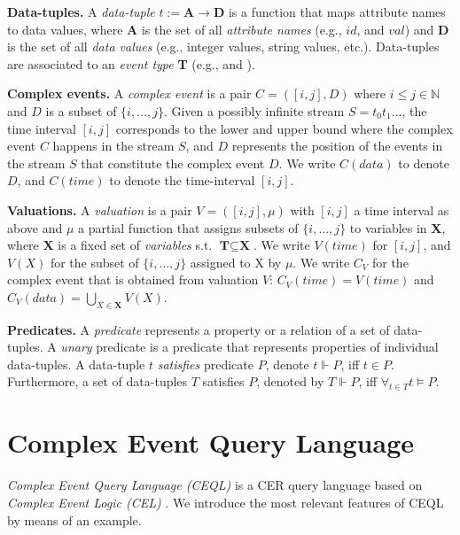 \textbf{Data-tuples.} A \emph{data-tuple} $t := \textbf{A} \to \textbf{D}$ is a function that maps attribute names to data values, where \textbf{A} is the set of all \emph{attribute names} (e.g., $id$, and $val$) and \textbf{D} is the set of all \emph{data values} (e.g., integer values, string values, etc.). Data-tuples are associated to an \emph{event type} \textbf{T} (e.g.,  and ).

\textbf{Complex events.} A \emph{complex event} is a pair $C = ([i,j], D)$ where $i \le j \in \mathbb{N}$ and $D$ is a subset of $\{i, \ldots, j\}$. Given a possibly infinite stream $S = t_{0}t_{1}\ldots$, the time interval $[i, j]$ corresponds to the lower and upper bound where the complex event $C$ happens in the stream $S$, and $D$ represents the position of the events in the stream $S$ that constitute the complex event $D$. We write $C(data)$ to denote $D$, and $C(time)$ to denote the time-interval $[i, j]$.

\textbf{Valuations.} A \emph{valuation} is a pair $V = ([i, j], \mu)$ with $[i,j]$ a time interval as above and $\mu$ a partial function that assigns subsets of $\{i, \ldots, j\}$ to variables in \textbf{X}, where \textbf{X} is a fixed set of \emph{variables} s.t. $\textbf{T} \subseteq \textbf{X}$. We write $V(time)$ for $[i,j]$, and $V(X)$ for the subset of $\{i,\ldots, j\}$ assigned to X by $\mu$. We write $C_{V}$ for the complex event that is obtained from valuation $V$: $C_{V}(time) = V(time)$ and $C_{V}(data) = \bigcup\limits_{X \in \textbf{X}} V(X)$.

\textbf{Predicates.} A \emph{predicate} represents a property or a relation of a set of data-tuples. A \emph{unary} predicate is a predicate that represents properties of individual data-tuples. A data-tuple $t$ \emph{satisfies} predicate $P$, denote $t \Vdash P$, iff $t \in P$. Furthermore, a set of data-tuples $T$ satisfies $P$, denoted by $T \Vdash P$, iff $\displaystyle\mathop{\forall}_{t \in T} t \vDash P$.

\section{Complex Event Query Language}\label{sec:ceql}

\emph{Complex Event Query Language (CEQL)} \cite{core} is a CER query language based on \emph{Complex Event Logic (CEL)} \cite{formal-framework-cep}. We introduce the most relevant features of CEQL by means of an example.

